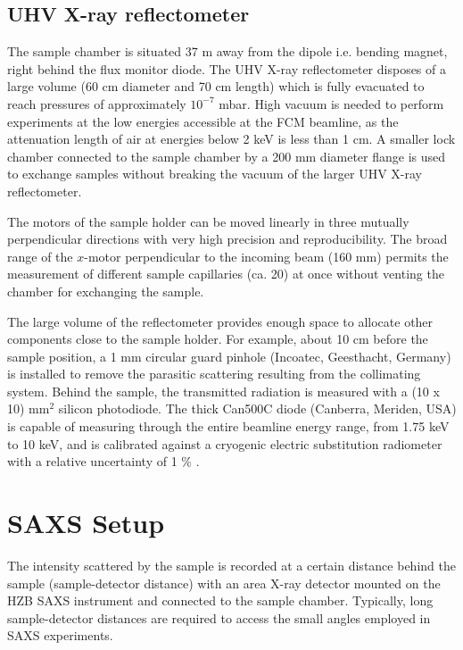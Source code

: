 \subsection{UHV X-ray reflectometer}

The sample chamber is situated 37 m away from the dipole i.e. bending magnet, right behind the flux monitor diode. The UHV X-ray reflectometer disposes of a large volume (60 cm diameter and 70 cm length) which is fully evacuated to reach pressures of approximately $10^{-7}$ mbar. High vacuum is needed to perform experiments at the low energies accessible at the FCM beamline, as the attenuation length of air at energies below 2 keV is less than 1 cm. A smaller lock chamber connected to the sample chamber by a 200 mm diameter flange is used to exchange samples without breaking the vacuum of the larger UHV X-ray reflectometer.

The motors of the sample holder can be moved linearly in three mutually perpendicular directions with very high precision and reproducibility. The broad range of the $x$-motor perpendicular to the incoming beam (160 mm) permits the measurement of different sample capillaries (ca. 20) at once without venting the chamber for exchanging the sample.

The large volume of the reflectometer provides enough space to allocate other components close to the sample holder. For example, about 10 cm before the sample position, a 1 mm circular guard pinhole (Incoatec, Geesthacht, Germany) is installed to remove the parasitic scattering resulting from the collimating system. Behind the sample, the transmitted radiation is measured with a (10 x 10) mm$^2$ silicon photodiode. The thick Can500C diode (Canberra, Meriden, USA) is capable of measuring through the entire beamline energy range, from 1.75 keV to 10 keV, and is calibrated against a cryogenic electric substitution radiometer with a relative uncertainty of 1 $\%$ \citep{krumrey_high-accuracy_2001}.

\section{SAXS Setup}
\label{sec:SAXS_experimental}

The intensity scattered by the sample is recorded at a certain distance behind the sample (sample-detector distance) with an area X-ray detector mounted on the HZB SAXS instrument and connected to the sample chamber. Typically, long sample-detector distances are required to access the small angles employed in SAXS experiments.


